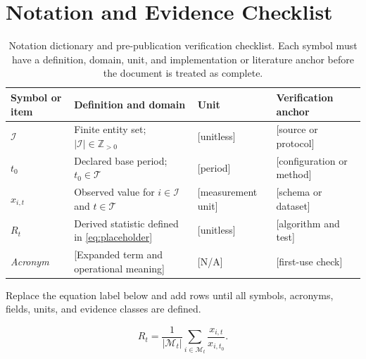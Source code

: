 \documentclass[10pt,a4paper]{article}
\begin{document}
\section{Notation and Evidence Checklist}
\begin{table}[htbp]
  \centering
  \small
  \caption{Notation dictionary and pre-publication verification checklist. Each
    symbol must have a definition, domain, unit, and implementation
    or literature
  anchor before the document is treated as complete.}
  \label{tab:notation-checklist}
  \begin{threeparttable}
    \begin{tabularx}{\linewidth}{l X l X}
      \toprule
      \textbf{Symbol or item} & \textbf{Definition and domain} &
      \textbf{Unit} & \textbf{Verification anchor} \\
      \midrule
      $\mathcal{I}$ & Finite entity set; $|\mathcal{I}| \in \mathbb{Z}_{>0}$ &
      [unitless] & [source or protocol] \\
      $t_0$ & Declared base period; $t_0 \in \mathcal{T}$ & [period] &
      [configuration or method] \\
      $x_{i,t}$ & Observed value for $i \in \mathcal{I}$ and $t \in
      \mathcal{T}$ &
      [measurement unit] & [schema or dataset] \\
      $R_t$ & Derived statistic defined in \cref{eq:placeholder} & [unitless] &
      [algorithm and test] \\
      \textit{Acronym} & [Expanded term and operational meaning] & [N/A] &
      [first-use check] \\
      \bottomrule
    \end{tabularx}
    \begin{tablenotes}[flushleft]
      \footnotesize
    \item Replace the equation label below and add rows until all symbols,
      acronyms, fields, units, and evidence classes are defined.
    \end{tablenotes}
  \end{threeparttable}
\end{table}

\begin{equation}
  \label{eq:placeholder}
  R_t = \frac{1}{|\mathcal{M}_t|}
  \sum_{i\in\mathcal{M}_t}\frac{x_{i,t}}{x_{i,t_0}}.
\end{equation}
\end{document}
